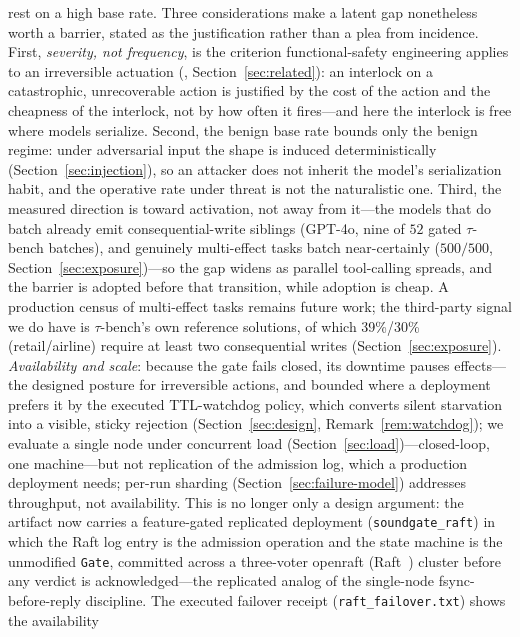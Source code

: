 \documentclass[10pt,journal,compsoc]{IEEEtran}
\begin{document}
rest on a high base rate. Three considerations make a latent gap nonetheless
worth a barrier, stated as the justification rather than a plea from
incidence. First, \emph{severity, not frequency}, is the criterion
functional-safety engineering applies to an irreversible actuation
(\cite{iec61508,iso26262}, Section~\ref{sec:related}): an interlock on a
catastrophic, unrecoverable action is justified by the cost of the action and
the cheapness of the interlock, not by how often it fires---and here the
interlock is free where models serialize. Second, the benign base rate bounds
only the benign regime: under adversarial input the shape is induced
deterministically (Section~\ref{sec:injection}), so an attacker does not
inherit the model's serialization habit, and the operative rate under threat
is not the naturalistic one. Third, the measured direction is toward
activation, not away from it---the models that do batch already emit
consequential-write siblings (GPT-4o, nine of $52$ gated $\tau$-bench
batches), and genuinely multi-effect tasks batch near-certainly ($500/500$,
Section~\ref{sec:exposure})---so the gap widens as
parallel tool-calling spreads, and the barrier is adopted before that
transition, while adoption is cheap. A production census of multi-effect
tasks remains future work; the third-party signal we do have is
$\tau$-bench's own reference solutions, of which 39\%/30\% (retail/airline)
require at least two consequential writes (Section~\ref{sec:exposure}).
\emph{Availability and scale}: because the gate
fails closed, its downtime pauses effects---the designed posture for
irreversible actions, and bounded where a deployment prefers it by the
executed TTL-watchdog policy, which converts silent starvation into a
visible, sticky rejection (Section~\ref{sec:design},
Remark~\ref{rem:watchdog}); we evaluate a single node under
concurrent load (Section~\ref{sec:load})---closed-loop, one machine---but not
replication of the admission log, which a production deployment needs; per-run
sharding (Section~\ref{sec:failure-model}) addresses throughput, not
availability. This is no longer only a design argument: the artifact now
carries a feature-gated replicated deployment (\texttt{soundgate\_raft}) in
which the Raft log entry is the admission operation and the state machine is
the unmodified \texttt{Gate}, committed across a three-voter openraft
(Raft~\cite{raft14}) cluster before any verdict is acknowledged---the
replicated analog of the single-node fsync-before-reply discipline. The
executed failover receipt (\texttt{raft\_failover.txt}) shows the availability
\end{document}
